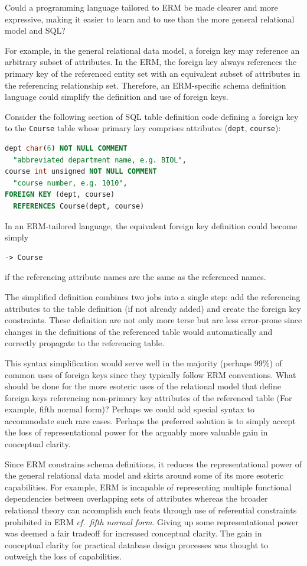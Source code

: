 \documentclass[letter,10pt]{article}
\begin{document}
Could a programming language tailored to ERM be made clearer and more expressive, making it easier to learn and to use than the more general relational model and SQL? 

For example, in the general relational data model, a foreign key may reference an arbitrary subset of attributes. In the ERM, the foreign key always references the primary key of the referenced entity set with an equivalent subset of attributes in the referencing relationship set.  Therefore, an ERM-specific schema definition language could simplify the definition and use of foreign keys.

Consider the following section of SQL table definition code defining a foreign key to the {\tt Course} table whose primary key comprises attributes ({\tt dept}, {\tt course}):
\begin{lstlisting}[language=SQL,morekeywords={COMMENT, REFERENCES, unsigned}]
dept char(6) NOT NULL COMMENT 
  "abbreviated department name, e.g. BIOL",
course int unsigned NOT NULL COMMENT 
  "course number, e.g. 1010",
FOREIGN KEY (dept, course) 
  REFERENCES Course(dept, course)
\end{lstlisting}
In an ERM-tailored language, the equivalent foreign key definition could become simply
\begin{lstlisting}[language=dj]
-> Course
\end{lstlisting}
if the referencing attribute names are the same as the referenced names.

The simplified definition combines two jobs into a single step:  add the referencing attributes to the table definition (if not already added) and create the foreign key constraints.  These definition are not only more terse but are less error-prone since changes in the definitions of the referenced table would automatically and correctly propagate to the referencing table. 

This syntax simplification would serve well in the majority (perhaps 99\%) of common uses of foreign keys since they typically follow ERM conventions. What should be done for the more esoteric uses of the relational model that define foreign keys referencing non-primary key attributes of the referenced table (For example, fifth normal form)?  Perhaps we could add special syntax to accommodate such rare cases. Perhaps the preferred solution is to simply accept the loss of representational power for the arguably more valuable gain in conceptual clarity. 

Since ERM constrains schema definitions, it reduces the representational power of the general relational data model and skirts around some of its more esoteric capabilities. 
For example, ERM is incapable of representing multiple functional dependencies between overlapping sets of attributes whereas the broader relational theory can accomplish such feats through use of referential constraints prohibited in ERM {\em cf.\ fifth normal form}.
Giving up some representational power was deemed a fair tradeoff for increased conceptual clarity.  The gain in conceptual clarity for practical database design processes was thought to outweigh the loss of capabilities.
\end{document}
